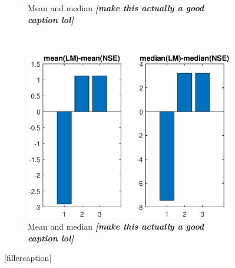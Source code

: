 \begin{figure}[ht]
\begin{subfigure}{0.50\linewidth}
\caption{Mean and median \textit{\textbf{[make this actually a good caption lol]}}}
\label{fig:flightCoopGoodMeanMed}
\end{subfigure}
\\
\begin{center}
\begin{subfigure}{0.50\linewidth}
\centering
\includegraphics[scale=0.6]{figures/flight_results/Coop_bar.eps}
\caption{Mean and median \textit{\textbf{[make this actually a good caption lol]}}}
\label{fig:flightCoopGoodUnweightSum}
\end{subfigure}
\end{center}
\caption{[fillercaption]}
\label{fig:flightCoopMeanMed}
\end{figure}



